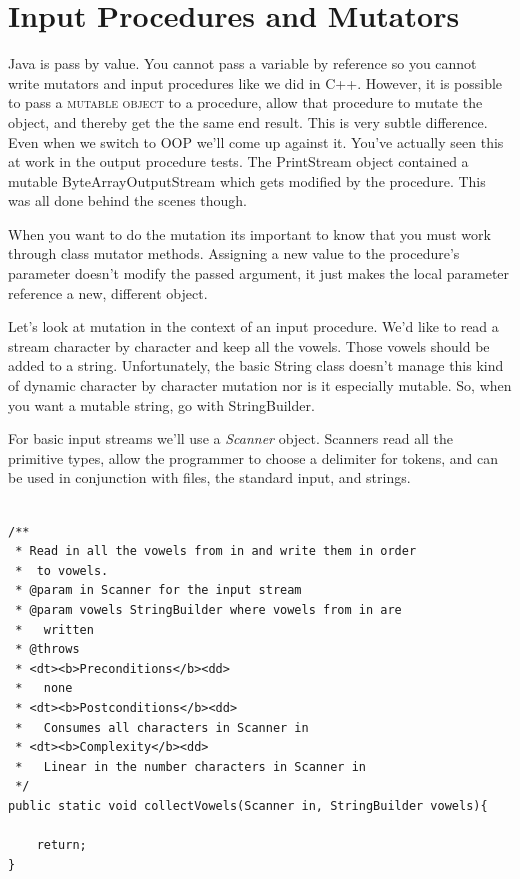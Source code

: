 \documentclass[]{tufte-handout}
\begin{document}
\section{Input Procedures and Mutators}

Java is pass by value. You cannot pass a variable by reference so you cannot write mutators and input procedures like we did in C++. However, it is possible to pass a \textsc{mutable object} to a procedure, allow that procedure to mutate the object, and thereby get the the same end result. This is very subtle difference. Even when we switch to OOP we'll come up against it. You've actually seen this at work in the output procedure tests. The PrintStream object contained a mutable ByteArrayOutputStream which gets modified by the procedure. This was all done behind the scenes though. 

When you want to do the mutation its important to know that you must work through class mutator methods. Assigning a new value to the procedure's parameter doesn't modify the passed argument, it just makes the local parameter reference a new, different object. 

Let's look at mutation in the context of an input procedure. We'd like to read a stream character by character and keep all the vowels. Those vowels should be added to a string. Unfortunately, the basic String class doesn't manage this kind of dynamic character by character mutation nor is it especially mutable. So, when you want a mutable string, go with StringBuilder. 

For basic input streams we'll use a \textit{Scanner} object. Scanners read all the primitive types, allow the programmer to choose a delimiter for tokens, and can be used in conjunction with files, the standard input, and strings. 




\begin{lstlisting}

/**
 * Read in all the vowels from in and write them in order
 *  to vowels.
 * @param in Scanner for the input stream
 * @param vowels StringBuilder where vowels from in are
 *   written
 * @throws
 * <dt><b>Preconditions</b><dd>
 *   none
 * <dt><b>Postconditions</b><dd>
 *   Consumes all characters in Scanner in
 * <dt><b>Complexity</b><dd>
 *   Linear in the number characters in Scanner in
 */
public static void collectVowels(Scanner in, StringBuilder vowels){

	return;
}

\end{lstlisting}
\end{document}
